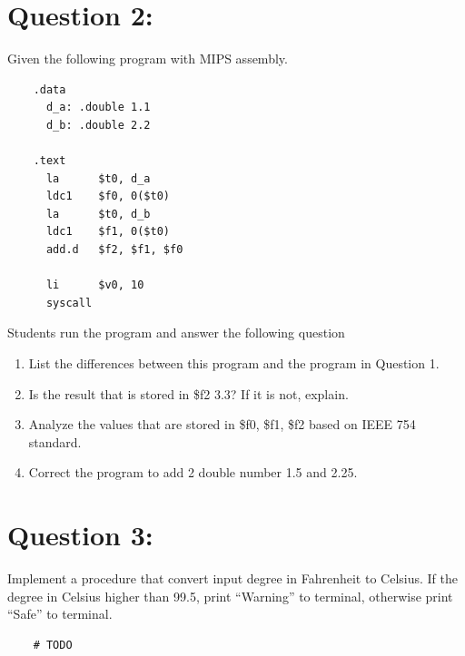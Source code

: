 \documentclass[12pt,a4paper]{article}
\begin{document}
\section*{Question 2:}
Given the following program with MIPS assembly.
\begin{mdframed}[hidealllines=true,backgroundcolor=magenta!10]
  \begin{lstlisting}
    .data
      d_a: .double 1.1
      d_b: .double 2.2

    .text
      la      $t0, d_a
      ldc1    $f0, 0($t0)
      la      $t0, d_b
      ldc1    $f1, 0($t0)
      add.d   $f2, $f1, $f0

      li      $v0, 10
      syscall
  \end{lstlisting}
\end{mdframed}
Students run the program and answer the following question
\begin{enumerate}
  \item List the differences between this program and the program in Question 1.
  \item Is the result that is stored in \$f2 3.3? If it is not, explain.
  \item Analyze the values that are stored in \$f0, \$f1, \$f2 based on IEEE 754 standard.
  \item Correct the program to add 2 double number 1.5 and 2.25.
\end{enumerate}

\section*{Question 3:}
Implement a procedure that convert input degree in Fahrenheit to Celsius.
If the degree in Celsius higher than 99.5, print ``Warning'' to terminal, otherwise print ``Safe'' to terminal.

\begin{mdframed}[hidealllines=true,backgroundcolor=magenta!10]
  \begin{lstlisting}
    # TODO
  \end{lstlisting}
\end{mdframed}
\end{document}
